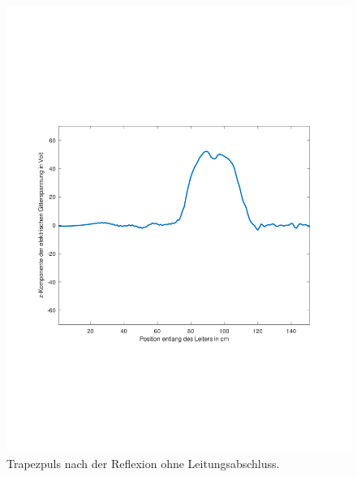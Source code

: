 \documentclass[Protokollheft.tex]{subfiles}
\begin{document}
\begin{figure}[ht]
	\centering
	\includegraphics[trim = 20mm 65mm 20mm 65mm, clip,width=0.7\linewidth]{Aufgabe1_2.pdf}
	\caption{Trapezpuls nach der Reflexion ohne Leitungsabschluss.}\label{fig:Aufg1_2}
\end{figure}
\end{document}

